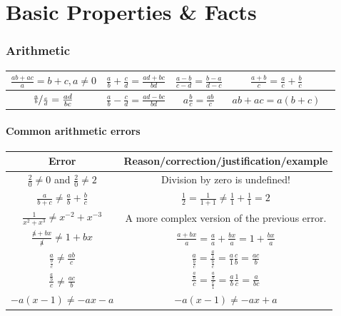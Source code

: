 \documentclass[10pt,onecolumn]{article}
\begin{document}
	\setlength{\parindent}{0pt}
\part{Basic Properties \& Facts}

\section{Arithmetic}
\begin{center}
{\renewcommand{\arraystretch}{2}
\begin{tabular}[c]{| c | c | c | c | c}
\hline
$\frac{ab + ac}{a} = b + c, a\neq 0 $ & 
$\frac{a}{b} + \frac{c}{d} = \frac{ad + bc}{bd}$ & 
$\frac{a - b}{c - d} = \frac{b - a}{d - c}$ &
$\frac{a + b}{c} = \frac{a}{c} + \frac{b}{c}$ \\
\hline
$\nicefrac{\frac{a}{b}}{\frac{c}{d}} = \frac{ad}{bc}$ & 
$\frac{a}{b} - \frac{c}{d} = \frac{ad - bc}{bd}$ & 
$a \frac{b}{c} = \frac{ab}{c}$ &
$ab + ac = a(b+c) $ \\
\hline
\end{tabular}}
\end{center}

\subsection{Common arithmetic errors}

\begin{center}
{\renewcommand{\arraystretch}{2}
\begin{tabular}{| c | c | }
\hline
Error & Reason/correction/justification/example \\
\hline
$\frac{2}{0} \neq 0 $ and $\frac{2}{0} \neq 2 $ & Division by zero is undefined! \\
\hline
$\frac{a}{b + c} \neq \frac{a}{b} + \frac{b}{c}$ & $\frac{1}{2} = \frac{1}{1 + 1} \neq \frac{1}{1} + \frac{1}{1} = 2$  \\
\hline
$\frac{1}{x^2 + x^3} \neq x^{-2} + x^{-3}$ & A more complex version of the previous error.  \\
\hline
$\frac{\not a + bx}{\not a} \neq 1 + bx$  & $\frac{a + bx}{a} = \frac{a}{a} + \frac{bx}{a} = 1 + \frac{bx}{a}$\\
\hline
$\frac{a}{\frac{b}{c}} \neq \frac{ab}{c}$ & $\frac{a}{\frac{b}{c}} = \frac{\frac{a}{1}}{\frac{b}{c}} = \frac{a}{1} \frac{c}{b} = \frac{ac}{b}$ \\
\hline
$\frac{\frac{a}{b}}{c} \neq \frac{ac}{b}$ & $\frac{\frac{a}{b}}{c} = \frac{\frac{a}{b}}{\frac{c}{1}} = \frac{a}{b} \frac{1}{c} = \frac{a}{bc}$ \\
\hline
$-a(x-1) \neq -ax - a$ & $-a(x-1) \neq -ax + a$  \\
\hline


\end{tabular}}
\end{center}
\end{document}
